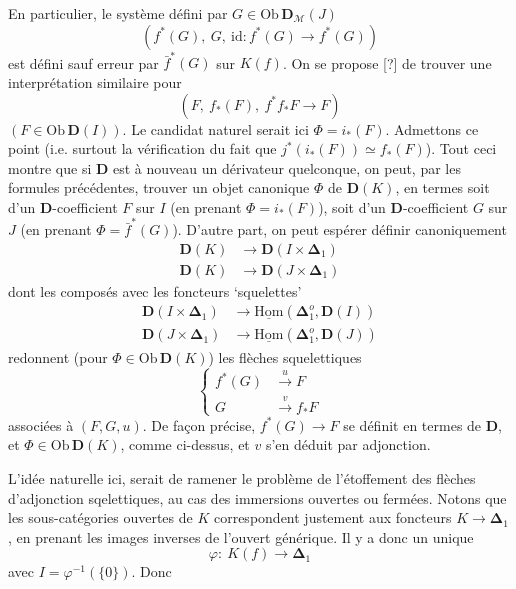 \documentclass[11pt]{article}
\newcommand{\msp}[1]{\marginpar{\footnotesize [#1]}}
\newcommand{\uHom}{\underline{\mathrm{Hom}}}
\newcommand{\Ob}{\mathrm{Ob}\,}
\newcommand{\bDelta}{\boldsymbol{\Delta}}
\newcommand{\id}{\mathrm{id}}
\begin{document}
En particulier, le système défini par $G \in \Ob \mathbf{D}_{\mathcal{M}}(J)$
\[ (f^*(G),\ G,\ \id : f^*(G) \longrightarrow f^*(G)) \]
est défini sauf erreur par $\bar{f}^*(G)$ sur $K(f)$. On se propose [?] de trouver une interprétation similaire pour
\[ (F,\ f_*(F),\ f^*f_*F \longrightarrow F) \]
$(F \in \Ob \mathbf{D}(I))$. Le candidat naturel serait ici $\Phi = i_*(F)$. Admettons ce point (i.e. surtout la vérification du fait que $j^*(i_*(F)) \simeq f_*(F)$). Tout ceci montre que si $\mathbf{D}$ est à nouveau un dérivateur quelconque, on peut, par les formules précédentes, trouver un objet canonique $\Phi$ de $\mathbf{D}(K)$, en termes soit d'un $\mathbf{D}$-coefficient $F$ sur $I$ (en prenant $\Phi = i_*(F)$), soit d'un $\mathbf{D}$-coefficient $G$ sur $J$ (en prenant $\Phi = \bar{f}^*(G)$). D'autre part, on peut espérer définir canoniquement
\[
\begin{aligned}
\mathbf{D}(K) &\longrightarrow \mathbf{D}(I \times \bDelta_1)\\
\mathbf{D}(K) &\longrightarrow \mathbf{D}(J \times \bDelta_1)
\end{aligned}
\]
dont les composés avec les foncteurs ‘squelettes’
\[
\begin{aligned}
\mathbf{D}(I \times \bDelta_1) &\longrightarrow \uHom(\bDelta_1^o, \mathbf{D}(I))\\
\mathbf{D}(J \times \bDelta_1) &\longrightarrow \uHom(\bDelta_1^o, \mathbf{D}(J))
\end{aligned}
\]
\msp{page 83}
redonnent (pour $\Phi \in \Ob \mathbf{D}(K)$) les flèches squelettiques
\[
\left\{
\begin{aligned}
f^*(G) &\xrightarrow{\ u\ } F\\
G &\xrightarrow{\ v\ } f_*F
\end{aligned}
\right.
\]
associées à $(F,G,u)$. De façon précise, $f^*(G) \longrightarrow F$ se définit en termes de $\mathbf{D}$, et $\Phi \in \Ob \mathbf{D}(K)$, comme ci-dessus, et $v$ s'en déduit par adjonction.

L'idée naturelle ici, serait de ramener le problème de l'étoffement des flèches d'adjonction sqelettiques, au cas des immersions ouvertes ou fermées. Notons que les sous-catégories ouvertes de $K$ correspondent justement aux foncteurs $K \longrightarrow \bDelta_1$, en prenant les images inverses de l'ouvert générique. Il y a donc un unique %
\[ \varphi :\ K(f) \longrightarrow \bDelta_1 \]
avec $I = \varphi^{-1}(\{0\})$. Donc 
\end{document}
